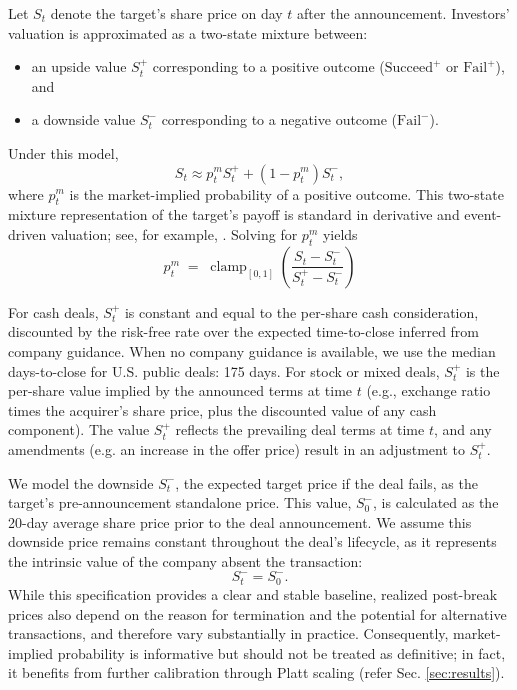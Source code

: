 \documentclass{article}
\theoremstyle{plain}
\theoremstyle{definition}
\theoremstyle{remark}
\newcommand{\SucceedPlus}{\boldsymbol{\mathrm{Succeed}^{+}}}
\newcommand{\FailPlus}{\boldsymbol{\mathrm{Fail}^{+}}}
\newcommand{\FailMinus}{\boldsymbol{\mathrm{Fail}^{-}}}
\begin{document}
Let $S_t$ denote the target’s share price on day $t$ after the announcement. Investors’ valuation is approximated as a two-state mixture between:
\begin{itemize}
    \item an upside value $S^+_t$ corresponding to a positive outcome ($\SucceedPlus$ or $\FailPlus$), and
    \item a downside value $S^-_t$ corresponding to a negative outcome ($\FailMinus$).
\end{itemize}
Under this model,
$$
S_t \approx p^m_t S^+_t + (1 - p^m_t) S^-_t,
$$
where $p^m_t$ is the market-implied probability of a positive outcome. 
This two-state mixture representation of the target’s payoff is standard in derivative and event-driven valuation; see, for example, \citet{hull2018options}.
Solving for $p^m_t$ yields
$$
p^m_t \;=\; \operatorname{clamp}_{[0,1]}\!\left(\frac{S_t - S^-_t}{S^+_t - S^-_t}\right)
$$


For cash deals, $S^+_t$ is constant and equal to the per-share cash consideration, discounted by the risk-free rate over the expected time-to-close inferred from company guidance. When no company guidance is available, we use the median days-to-close for U.S. public deals: 175 days. For stock or mixed deals, $S^+_t$ is the per-share value implied by the announced terms at time $t$ (e.g., exchange ratio times the acquirer’s share price, plus the discounted value of any cash component). The value $S^+_t$ reflects the prevailing deal terms at time $t$, and any amendments (e.g. an increase in the offer price) result in an adjustment to $S^+_t$. 


We model the downside $S^-_t$, the expected target price if the deal fails, as the target’s pre-announcement standalone price. This value, $S^-_0$, is calculated as the 20-day average share price prior to the deal announcement. We assume this downside price remains constant throughout the deal’s lifecycle, as it represents the intrinsic value of the company absent the transaction:
$$
S^-_t = S^-_0.
$$
While this specification provides a clear and stable baseline, realized post-break prices also depend on the reason for termination and the potential for alternative transactions, and therefore vary substantially in practice. Consequently, market-implied probability is informative but should not be treated as definitive; in fact, it benefits from further calibration through Platt scaling (refer Sec. \ref{sec:results}).
\end{document}
